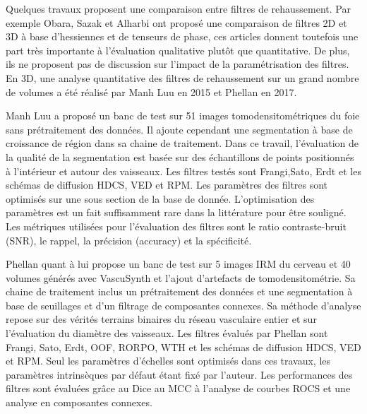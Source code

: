  Quelques travaux proposent une comparaison entre filtres de rehaussement. Par exemple Obara, Sazak et Alharbi \cite{Sazak2019_bowler_hat_2D} \cite{Alharbi2018_TP_2D_3D} ont proposé une comparaison de filtres 2D et 3D à base d'hessiennes et de tenseurs de phase, ces articles donnent toutefois une part très importante à l'évaluation qualitative plutôt que quantitative. De plus, ils ne proposent pas de discussion sur l'impact de la paramétrisation des filtres. En 3D, une analyse quantitative des filtres de rehaussement sur un grand nombre de volumes a été réalisé par Manh Luu en 2015 \cite{Luu2015_liver_vesselness_comparison} et Phellan \cite{Phellan2017_Brain_vesselness_comparison} en 2017.

Manh Luu a proposé un banc de test sur 51 images tomodensitométriques du foie sans prétraitement des données. Il ajoute cependant une segmentation à base de croissance de région dans sa chaine de traitement. Dans ce travail, l'évaluation de la qualité de la segmentation est basée sur des échantillons de points positionnés à l'intérieur et autour des vaisseaux. Les filtres testés sont Frangi,Sato, Erdt et les schémas de diffusion HDCS, VED et RPM. Les paramètres des filtres sont optimisés sur une sous section de la base de donnée. L'optimisation des paramètres est un fait suffisamment rare dans la littérature pour être souligné. Les métriques utilisées pour l'évaluation des filtres sont le ratio contraste-bruit (SNR), le rappel, la précision (accuracy) et la spécificité.

Phellan quant à lui propose un banc de test sur 5 images IRM du cerveau et 40 volumes générés avec    VascuSynth et l'ajout d'artefacts de tomodensitométrie. Sa chaine de traitement inclus un prétraitement des données et une segmentation à base de seuillages et d'un filtrage de composantes connexes. Sa méthode d'analyse repose sur des vérités terrains binaires du réseau vasculaire entier et sur l'évaluation du diamètre des vaisseaux. Les filtres évalués par Phellan sont Frangi, Sato, Erdt, OOF, RORPO, WTH et les schémas de diffusion HDCS, VED et RPM. Seul les paramètres d'échelles sont optimisés dans ces travaux, les paramètres intrinsèques par défaut étant fixé par l'auteur. Les performances des filtres sont évaluées grâce au Dice au MCC à l'analyse de courbes ROCS et une analyse en composantes connexes.


